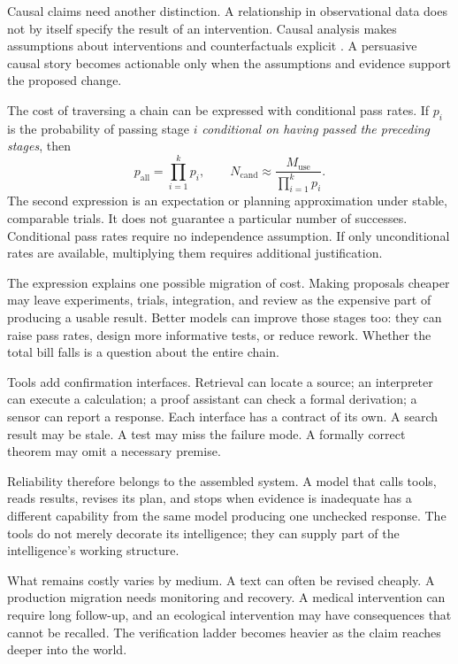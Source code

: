 \documentclass[11pt,openany]{book}
\begin{document}
Causal claims need another distinction. A relationship in observational data does not by itself specify the result of an intervention. Causal analysis makes assumptions about interventions and counterfactuals explicit \cite{pearl2009causality}. A persuasive causal story becomes actionable only when the assumptions and evidence support the proposed change.

The cost of traversing a chain can be expressed with conditional pass rates. If $p_i$ is the probability of passing stage $i$ \emph{conditional on having passed the preceding stages}, then
\begin{equation}
 p_{\mathrm{all}}=\prod_{i=1}^{k}p_i,
 \qquad
 N_{\mathrm{cand}}\approx
 \frac{M_{\mathrm{use}}}{\prod_{i=1}^{k}p_i}.
\end{equation}
The second expression is an expectation or planning approximation under stable, comparable trials. It does not guarantee a particular number of successes. Conditional pass rates require no independence assumption. If only unconditional rates are available, multiplying them requires additional justification.

The expression explains one possible migration of cost. Making proposals cheaper may leave experiments, trials, integration, and review as the expensive part of producing a usable result. Better models can improve those stages too: they can raise pass rates, design more informative tests, or reduce rework. Whether the total bill falls is a question about the entire chain.

Tools add confirmation interfaces. Retrieval can locate a source; an interpreter can execute a calculation; a proof assistant can check a formal derivation; a sensor can report a response. Each interface has a contract of its own. A search result may be stale. A test may miss the failure mode. A formally correct theorem may omit a necessary premise.

Reliability therefore belongs to the assembled system. A model that calls tools, reads results, revises its plan, and stops when evidence is inadequate has a different capability from the same model producing one unchecked response. The tools do not merely decorate its intelligence; they can supply part of the intelligence's working structure.

What remains costly varies by medium. A text can often be revised cheaply. A production migration needs monitoring and recovery. A medical intervention can require long follow-up, and an ecological intervention may have consequences that cannot be recalled. The verification ladder becomes heavier as the claim reaches deeper into the world.
\end{document}
